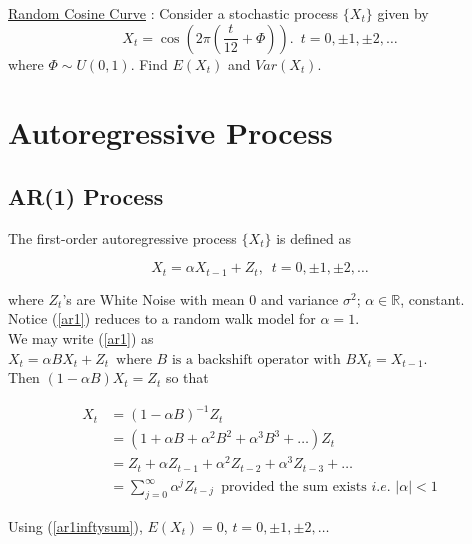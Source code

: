 \documentclass[11pt, a4paper]{article}
\numberwithin{equation}{section}
\theoremstyle{definition}
\begin{document}
\vspace{0.5cm}


\bcquestion \hspace{0.1cm} \underline{Random Cosine Curve} : Consider a stochastic process $\{X_t\}$ given by $$X_t = \cos \left( 2\pi \left( \dfrac{t}{12} + \Phi \right) \right). \,\,\, t = 0, \pm 1, \pm 2, \ldots$$
where $\Phi \sim U(0, 1)$. Find $E(X_t)$ and $Var(X_t)$.

\newpage
\section{Autoregressive Process}

\subsection{AR(1) Process}

The first-order autoregressive process $\{X_t\}$ is defined as

\begin{equation}\label{ar1}
X_t = \alpha X_{t-1} + Z_t, \,\,\, t = 0, \pm 1, \pm 2, \ldots
\end{equation}

where $Z_t$'s are White Noise with mean $0$ and variance $\sigma^2$; $\alpha \in \mathbb{R}$, constant. \\

Notice (\ref{ar1}) reduces to a random walk model for $\alpha = 1$. \\

We may write (\ref{ar1}) as $X_t = \alpha BX_{t} + Z_t \,\,\, \text{where } B \text{ is a backshift operator with } BX_t = X_{t-1}$. \\

Then $(1 - \alpha B) X_t = Z_t$ so that

\begin{align}\label{ar1inftysum}
X_t &= (1 - \alpha B)^{-1} Z_t \nonumber \\
&= (1 + \alpha B + \alpha^2 B^2 + \alpha^3 B^3 + \ldots) Z_t \nonumber \\
&= Z_t + \alpha Z_{t-1} + \alpha^2 Z_{t-2} + \alpha^3 Z_{t-3} + \ldots \nonumber \\
&= \sum \limits_{j = 0}^{\infty} \alpha^j Z_{t-j} \,\,\, \text{provided the sum exists } i.e. \,\, |\alpha| < 1
\end{align}

Using (\ref{ar1inftysum}), $E(X_t) = 0$, $t = 0, \pm 1, \pm 2, \ldots$ \\
\end{document}
